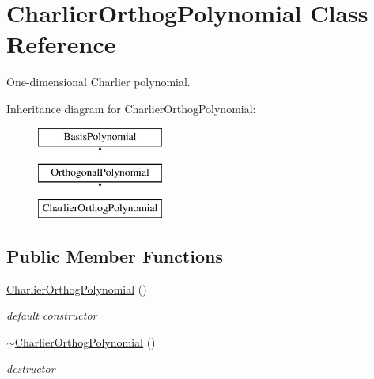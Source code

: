 \section{Charlier\+Orthog\+Polynomial Class Reference}
\label{classPecos_1_1CharlierOrthogPolynomial}


One-\/dimensional Charlier polynomial.  


Inheritance diagram for Charlier\+Orthog\+Polynomial\+:\begin{figure}[H]
\begin{center}
\leavevmode
\includegraphics[height=3.000000cm]{classPecos_1_1CharlierOrthogPolynomial}
\end{center}
\end{figure}
\subsection*{Public Member Functions}
\begin{DoxyCompactItemize}
\item 
\hyperlink{classPecos_1_1CharlierOrthogPolynomial_a2fbeb789bb30be5edeeb764b942f9b2a}{Charlier\+Orthog\+Polynomial} ()\label{classPecos_1_1CharlierOrthogPolynomial_a2fbeb789bb30be5edeeb764b942f9b2a}

\begin{DoxyCompactList}\small\item\em default constructor \end{DoxyCompactList}\item 
\hyperlink{classPecos_1_1CharlierOrthogPolynomial_a8867cc03efde2b2a285f5b133a5c1b37}{$\sim$\+Charlier\+Orthog\+Polynomial} ()\label{classPecos_1_1CharlierOrthogPolynomial_a8867cc03efde2b2a285f5b133a5c1b37}

\begin{DoxyCompactList}\small\item\em destructor \end{DoxyCompactList}\end{DoxyCompactItemize}
